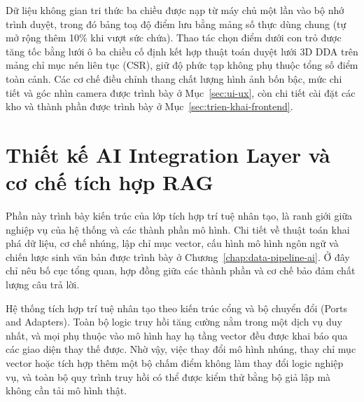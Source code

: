Dữ liệu không gian tri thức ba chiều được nạp từ máy chủ một lần vào bộ nhớ trình duyệt, trong đó bảng toạ độ điểm lưu bằng mảng số thực dùng chung (tự mở rộng thêm 10\% khi vượt sức chứa). Thao tác chọn điểm dưới con trỏ được tăng tốc bằng lưới ô ba chiều cố định kết hợp thuật toán duyệt lưới 3D DDA trên mảng chỉ mục nén liên tục (CSR), giữ độ phức tạp không phụ thuộc tổng số điểm toàn cảnh. Các cơ chế điều chỉnh thang chất lượng hình ảnh bốn bậc, mức chi tiết và góc nhìn camera được trình bày ở Mục~\ref{sec:ui-ux}, còn chi tiết cài đặt các kho và thành phần được trình bày ở Mục~\ref{sec:trien-khai-frontend}.

\section{Thiết kế AI Integration Layer và cơ chế tích hợp RAG}
\label{sec:ai-integration-layer}

Phần này trình bày kiến trúc của lớp tích hợp trí tuệ nhân tạo, là ranh giới giữa nghiệp vụ của hệ thống và các thành phần mô hình. Chi tiết về thuật toán khai phá dữ liệu, cơ chế nhúng, lập chỉ mục vector, cấu hình mô hình ngôn ngữ và chiến lược sinh văn bản được trình bày ở Chương~\ref{chap:data-pipeline-ai}. Ở đây chỉ nêu bố cục tổng quan, hợp đồng giữa các thành phần và cơ chế bảo đảm chất lượng câu trả lời.

Hệ thống tích hợp trí tuệ nhân tạo theo kiến trúc cổng và bộ chuyển đổi (Ports and Adapters). Toàn bộ logic truy hồi tăng cường nằm trong một dịch vụ duy nhất, và mọi phụ thuộc vào mô hình hay hạ tầng vector đều được khai báo qua các giao diện thay thế được. Nhờ vậy, việc thay đổi mô hình nhúng, thay chỉ mục vector hoặc tích hợp thêm một bộ chấm điểm không làm thay đổi logic nghiệp vụ, và toàn bộ quy trình truy hồi có thể được kiểm thử bằng bộ giả lập mà không cần tải mô hình thật.

